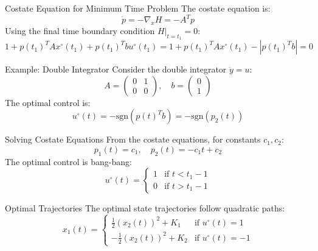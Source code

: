 \documentclass[10pt]{beamer}
\begin{document}
\begin{frame}[fragile]{Costate Equation for Minimum Time Problem}
  The costate equation is:
  \[
  \dot{p} = -\nabla_x H = -A^T p
  \]
  Using the final time boundary condition \( H|_{t=t_1} = 0 \):
  \[
  1 + p(t_1)^T A x^\circ(t_1) + p(t_1)^T b u^\circ(t_1) = 1 + p(t_1)^T A x^\circ(t_1) - |p(t_1)^T b| = 0
  \]
\end{frame}
  
\begin{frame}[fragile]{Example: Double Integrator}
  Consider the double integrator \( \ddot{y} = u \):
  \[
  A = \begin{pmatrix} 0 & 1 \\ 0 & 0 \end{pmatrix}, \quad b = \begin{pmatrix} 0 \\ 1 \end{pmatrix}
  \]
  The optimal control is:
  \[
  u^\circ(t) = -\text{sgn}(p(t)^T b) = -\text{sgn}(p_2(t))
  \]
\end{frame}
  
\begin{frame}[fragile]{Solving Costate Equations}
  From the costate equations, for constants \( c_1, c_2 \):
  \[
  p_1(t) = c_1, \quad p_2(t) = -c_1 t + c_2
  \]
  The optimal control is bang-bang:
  \[
  u^\circ(t) = \begin{cases}
  1 & \text{if } t < t_1 - 1 \\
  0 & \text{if } t > t_1 - 1
  \end{cases}
  \]
\end{frame}
  
\begin{frame}[fragile]{Optimal Trajectories}
  The optimal state trajectories follow quadratic paths:
  \[
  x_1(t) = \begin{cases}
  \frac{1}{2} (x_2(t))^2 + K_1 & \text{if } u^\circ(t) = 1 \\
  -\frac{1}{2} (x_2(t))^2 + K_2 & \text{if } u^\circ(t) = -1
  \end{cases}
  \]
\end{frame}
\end{document}
